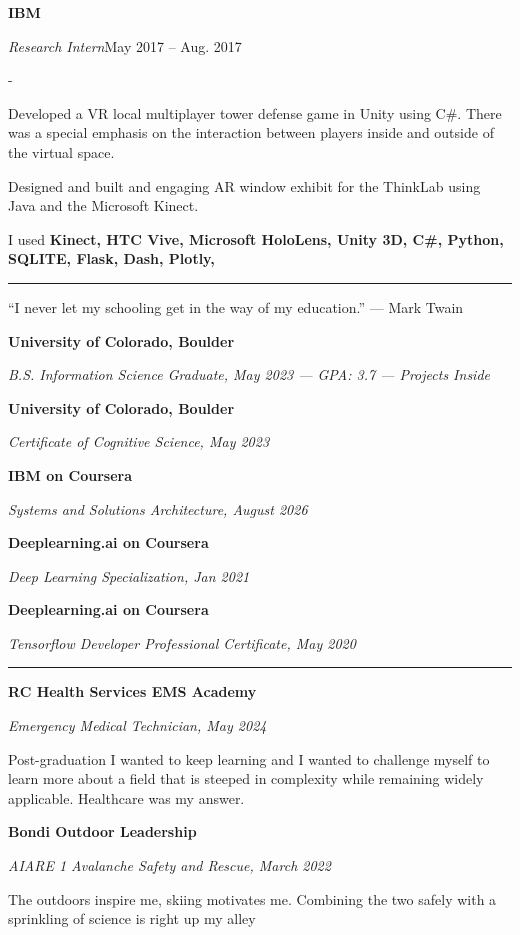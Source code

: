 \documentclass[10pt,letterpaper]{article}
\newenvironment{cvitems}{%
  \begin{list}{-}{%
    \setlength{\leftmargin}{12pt}%
    \setlength{\itemsep}{1.2pt}%
    \setlength{\parsep}{0pt}%
    \setlength{\topsep}{1.5pt}%
    \setlength{\partopsep}{0pt}%
    \setlength{\labelwidth}{6pt}%
    \setlength{\labelsep}{6pt}%
    \setlength{\itemindent}{0pt}%
  }%
}{\end{list}}
\newcommand{\cvsection}[1]{%
  \vspace{7pt}%
  \noindent{\bfseries\fontsize{11pt}{13pt}\selectfont\MakeUppercase{#1}}\par
  \vspace{1pt}%
  \noindent\rule{\textwidth}{0.4pt}\par
  \vspace{4pt}%
}
\newcommand{\cventryhead}[4]{%
  \noindent\textbf{#1}\hfill#2\par
  \vspace{0.5pt}%
  \noindent\textit{#3}\hfill#4\par
}
\newcommand{\cveduhead}[4]{%
  \noindent\textbf{#1}\hfill#2\par
  \vspace{0.5pt}%
  \noindent\textit{#3}\hfill#4\par
}
\begin{document}
\cventryhead{IBM}{}{Research Intern}{May 2017 -- Aug. 2017}
\begin{cvitems}
  \item Developed a VR local multiplayer tower defense game in Unity using C\#. There was a special emphasis on the interaction between players inside and outside of the virtual space.
  \item Designed and built and engaging AR window exhibit for the ThinkLab using Java and the Microsoft Kinect.
  \item I used \textbf{Kinect, HTC Vive, Microsoft HoloLens, Unity 3D, C\#, Python, SQLITE, Flask, Dash, Plotly,}
\end{cvitems}

\cvsection{Education}

\noindent ``I never let my schooling get in the way of my education.'' --- Mark Twain\par
\vspace{4pt}

\cveduhead{University of Colorado, Boulder}{}{B.S. Information Science Graduate, May 2023 --- GPA: 3.7 --- Projects Inside}{}
\cveduhead{University of Colorado, Boulder}{}{Certificate of Cognitive Science, May 2023}{}

\vspace{5pt}
\cveduhead{IBM on Coursera}{}{Systems and Solutions Architecture, August 2026}{}
\cveduhead{Deeplearning.ai on Coursera}{}{Deep Learning Specialization, Jan 2021}{}
\cveduhead{Deeplearning.ai on Coursera}{}{Tensorflow Developer Professional Certificate, May 2020}{}

\cvsection{Other interests}

\cveduhead{RC Health Services EMS Academy}{}{Emergency Medical Technician, May 2024}{}
\noindent Post-graduation I wanted to keep learning and I wanted to challenge myself to learn more about a field that is steeped in complexity while remaining widely applicable. Healthcare was my answer.\par

\vspace{5pt}
\cveduhead{Bondi Outdoor Leadership}{}{AIARE 1 Avalanche Safety and Rescue, March 2022}{}
\noindent The outdoors inspire me, skiing motivates me. Combining the two safely with a sprinkling of science is right up my alley\par
\end{document}
